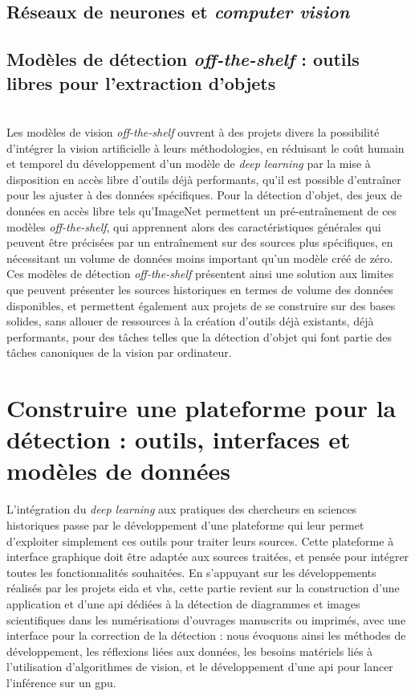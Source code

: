 \documentclass[a4paper,12pt,twoside]{book}
\newcommand{\api}{\gls{api}\xspace}
\newcommand{\eida}{\gls{eida}\xspace}
\newcommand{\gpu}{\gls{gpu}\xspace}
\newcommand{\vhs}{\gls{vhs}\xspace}
\newcommand{\clearemptydoublepage}{\newpage{\pagestyle{empty}\cleardoublepage}}
\begin{document}
            \section{\label{neuralNets}Réseaux de neurones et \textit{computer vision}}
                
        
            \section[Modèles de vision \textit{off-the-shelf}]{Modèles de détection \textit{off-the-shelf} : outils libres pour l'extraction d’objets}
                
        	\\
		
		Les modèles de vision \textit{off-the-shelf} ouvrent à des projets divers la possibilité d'intégrer la vision artificielle à leurs méthodologies, en réduisant le coût humain et temporel du développement d'un modèle de \textit{deep learning} par la mise à disposition en accès libre d'outils déjà performants, qu'il est possible d'entraîner pour les ajuster à des données spécifiques. Pour la détection d'objet, des jeux de données en accès libre tels qu'ImageNet permettent un pré-entraînement de ces modèles \textit{off-the-shelf}, qui apprennent alors des caractéristiques générales qui peuvent être précisées par un entraînement sur des sources plus spécifiques, en nécessitant un volume de données moins important qu'un modèle créé de zéro. Ces modèles de détection \textit{off-the-shelf} présentent ainsi une solution aux limites que peuvent présenter les sources historiques en termes de volume des données disponibles, et permettent également aux projets de se construire sur des bases solides, sans allouer de ressources à la création d'outils déjà existants, déjà performants, pour des tâches telles que la détection d'objet qui font partie des tâches canoniques de la vision par ordinateur.
        \clearemptydoublepage
        
        \chapter[Construire une plateforme pour la détection]{Construire une plateforme pour la détection : outils, interfaces et modèles de données}
        L'intégration du \textit{deep learning} aux pratiques des chercheurs en sciences historiques passe par le développement d'une plateforme qui leur permet d'exploiter simplement ces outils pour traiter leurs sources. Cette plateforme à interface graphique doit être adaptée aux sources traitées, et pensée pour intégrer toutes les fonctionnalités souhaitées. En s'appuyant sur les développements réalisés par les projets \eida et \vhs, cette partie revient sur la construction d'une application  et d'une \api dédiées à la détection de diagrammes et images scientifiques dans les numérisations d'ouvrages manuscrits ou imprimés, avec une interface pour la correction de la détection : nous évoquons ainsi les méthodes de développement, les réflexions liées aux données, les besoins matériels liés à l'utilisation d'algorithmes de vision, et le développement d'une \api pour lancer l'inférence sur un \gpu. 
         
\end{document}
